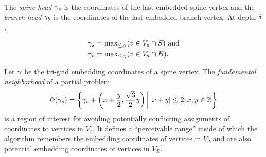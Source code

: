 The \emph{spine head} $\gamma_s$ is the coordinates of the last embedded spine vertex and the \emph{branch head} $\gamma_b$ is the coordinates of the last embedded branch vertex. At depth $\delta$, 

\begin{equation*}
\begin{aligned}
\gamma_s &= \mathrm{max}_{\leq_G}(v \in V_d \cap S) \text{ and} \\
\gamma_b &= \mathrm{max}_{\leq_G}(v \in V_d \cap B).
\end{aligned}
\end{equation*}

Let $\gamma$ be the tri-grid embedding coordinates of a spine vertex. The \emph{fundamental neighborhood} of a partial problem 
\[
\Phi(\gamma_s) = \left\{ \gamma_s + \left(x + \frac y2, \frac{\sqrt3}2 y\right) \,\middle|\,|x + y| \leq 2; x, y \in \mathbb Z \right\}
\]
is a region of interest for avoiding potentially conflicting assignments of coordinates to vertices in $V_r$. It defines a ``perceivable range'' inside of which the algorithm remembers the embedding coordinates of vertices in $V_d$ and are also potential embedding coordinates of vertices in $V_R$.

